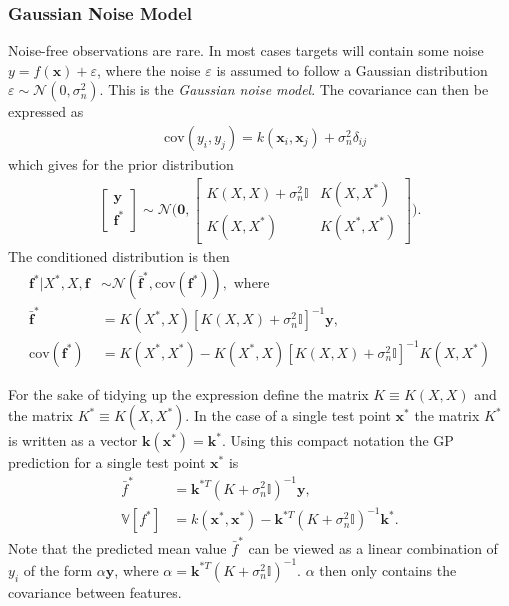 \documentclass[twoside,english]{uiofysmaster}
\begin{document}
\subsubsection{Gaussian Noise Model}

Noise-free observations are rare. In most cases targets will contain some noise $y = f(\textbf{x}) + \varepsilon$, where the noise $\varepsilon$ is assumed to follow a Gaussian distribution $\varepsilon \sim \mathcal{N}(0, \sigma_n^2)$. This is the \textit{Gaussian noise model}. The covariance can then be expressed as
\begin{align}
&\text{cov}(y_i, y_j) = k(\textbf{x}_i, \textbf{x}_j) + \sigma_n^2 \delta_{ij} 
\end{align}
which gives for the prior distribution
\begin{align}
\begin{bmatrix}
\textbf{y}\\
\textbf{f}^*
\end{bmatrix}
\sim 
\mathcal{N} \Bigg(
\boldsymbol{0},
\begin{bmatrix}
K(X, X) + \sigma_n^2 \mathbb{I} & K(X, X^*)\\
K(X, X^*) & K(X^*, X^*)
\end{bmatrix}
 \Bigg).
\end{align}
The conditioned distribution is then 
\begin{align}
\textbf{f}^* \big| X^*, X, \textbf{f} & \sim \mathcal{N}(\bar{\textbf{f}}^*, \text{cov}(\textbf{f}^*)), \text{ where} \\
\bar{\textbf{f}}^* &= K(X^*, X) [K(X, X) + \sigma_n^2 \mathbb{I}]^{-1} \textbf{y},\\
\text{cov} (\textbf{f}^*) &= K(X^*, X^*) - K(X^*, X)[K(X, X) + \sigma_n^2 \mathbb{I}]^{-1} K(X, X^*) 
\end{align}

For the sake of tidying up the expression define the matrix $K \equiv K(X, X)$ and the matrix $K^* \equiv K(X, X^*)$. In the case of a single test point $\textbf{x}^*$ the matrix $K^*$ is written as a vector $\textbf{k}(\textbf{x}^*) = \textbf{k}^*$. Using this compact notation the GP prediction for a single test point $\textbf{x}^*$ is
\begin{align}
\bar{f}^* &= \textbf{k}^{*T}(K + \sigma_n^2\mathbb{I})^{-1} \textbf{y},\label{Eq:: gaussian process : GP prediction mean}\\
\mathbb{V}[f^*] &= k(\textbf{x}^*, \textbf{x}^*) - \textbf{k}^{*T}(K + \sigma_n^2 \mathbb{I})^{-1} \textbf{k}^*\label{Eq:: gaussian process : GP prediction variance}.
\end{align}
Note that the predicted mean value $\bar{f}^*$ can be viewed as a linear combination of $y_i$ of the form $\alpha \textbf{y}$, where $\alpha = \textbf{k}^{*T}(K + \sigma_n^2\mathbb{I})^{-1}$. $\alpha$ then only contains the covariance between features.
\end{document}
